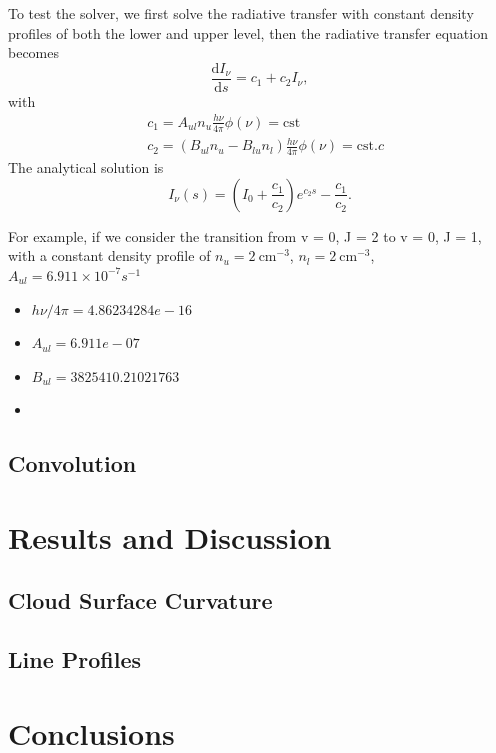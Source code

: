 \documentclass[12pt,a4paper]{article}
\newcommand{\mr}{\mathrm}
\newcommand{\fird}[2][]{\frac{\mathrm{d}#1}{\mathrm{d}#2}}
\begin{document}
To test the solver, we first solve the radiative transfer with constant density profiles of both the lower and upper level, then the radiative transfer equation becomes
\begin{equation}
    \fird[I_\nu]{s} = c_1  + c_2 I_\nu, \label{eq:simple_rte}
\end{equation} 
with 
\begin{align*}
    &c_1 = A_{ul} n_u \frac{h\nu}{4\pi} \phi(\nu) = \mr{cst}\\
    &c_2 = \left(B_{ul} n_u - B_{lu} n_l\right) \frac{h\nu}{4\pi} \phi(\nu) = \mr{cst}.c
\end{align*}
The analytical solution is 
\begin{equation}
    I_\nu (s) = (I_0 + \frac{c_1}{c_2})e^{c_2s} - \frac{c_1}{c_2}.
\end{equation}

For example, if we consider the  transition from v = 0, J = 2 to v = 0, J = 1, with a constant density profile of $n_u = \qty{2}{\cm^{-3}}$, $n_l = \qty{2}{\cm^{-3}}$, $A_{ul} = 6.911 \times 10^{-7} s^{-1}$
\begin{itemize}
    \item $h\nu/4\pi = 4.86234284e-16 $
    \item $A_{ul} = 6.911e-07$
    \item $B_{ul} = 3825410.21021763$
    \item 
\end{itemize}

\subsection{Convolution}

\section{Results and Discussion}
\subsection{Cloud Surface Curvature}
\subsection{Line Profiles}

\section{Conclusions}

\newpage
\printbibliography
\end{document}
